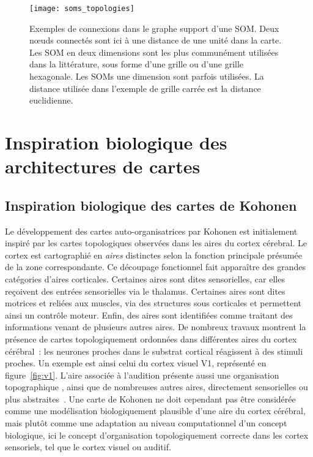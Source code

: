 \documentclass[../main]{subfiles}
\begin{document}
\begin{figure}
\centering
\texttt{[image: soms\_topologies]}
\caption{Exemples de connexions dans le graphe support d'une SOM. Deux n\oe{}uds connectés sont ici à une distance de une unité dans la carte.
Les SOM en deux dimensions sont les plus communément utilisées dans la littérature, sous forme d'une grille ou d'une grille hexagonale. Les SOMs une dimension sont parfois utilisées. La distance utilisée dans l'exemple de grille carrée est la distance euclidienne.
\label{fig:topo}}
\end{figure}




\section{Inspiration biologique des architectures de cartes}

\subsection{Inspiration biologique des cartes de Kohonen}
Le développement des cartes auto-organisatrices par Kohonen est initialement inspiré par les cartes topologiques observées dans les aires du cortex cérebral. 
Le cortex est cartographié en \emph{aires} distinctes selon la fonction principale présumée de la zone correspondante.
Ce découpage fonctionnel fait apparaître des grandes catégories d'aires corticales. 
Certaines aires sont dites sensorielles, car elles reçoivent des entrées sensorielles via le thalamus. Certaines aires sont dites motrices et reliées aux muscles, via des structures sous corticales et permettent ainsi un contrôle moteur.
Enfin, des aires sont identifiées comme traitant des informations venant de plusieurs autres aires.
De nombreux travaux montrent la présence de cartes topologiquement ordonnées dans différentes aires du cortex cérébral~: les neurones proches dans le substrat cortical réagissent à des stimuli proches. 
Un exemple est ainsi celui du cortex visuel V1, représenté en figure~\ref{fig:v1}. 
L'aire associée à l'audition présente aussi une organisation topographique \cite{Reale1980TonotopicOI}, ainsi que de nombreuses autres aires, directement sensorielles ou plus abstraites~\cite{Kohonen1995SelfOrganizingM}. 
Une carte de Kohonen ne doit cependant pas être considérée comme une modélisation biologiquement plausible d'une aire du cortex cérébral, mais plutôt comme une adaptation au niveau computationnel d'un concept biologique, ici le concept d'organisation topologiquement correcte dans les cortex sensoriels, tel que le cortex visuel ou auditif.
\end{document}
